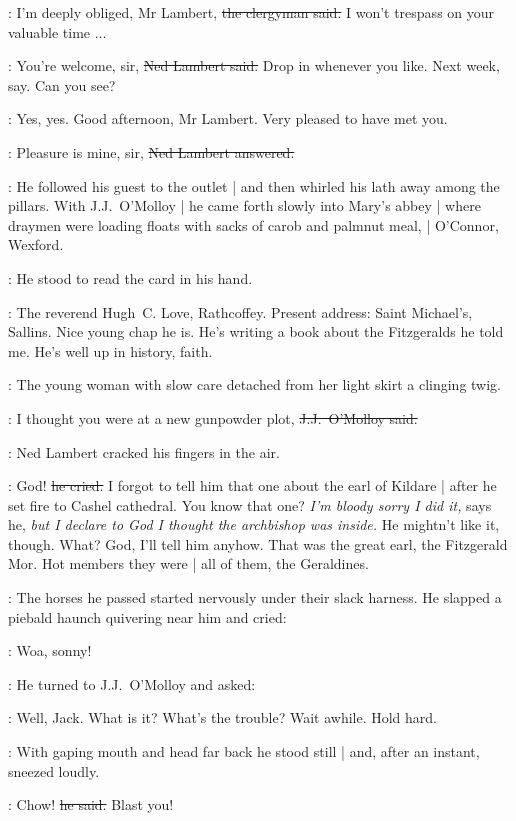 \revlove:
I'm deeply obliged, Mr Lambert,
\sout{the clergyman said.}
I won't trespass on your valuable time ...

\lambert:
You're welcome, sir,
\sout{Ned Lambert said.}
Drop in whenever you like.
Next week, say.
Can you see?

\revlove:
Yes, yes.
Good afternoon, Mr Lambert.
Very pleased to have met you.

\lambert:
Pleasure is mine, sir,
\sout{Ned Lambert answered.}

:
He followed his guest to the outlet |
and then whirled his lath away among the pillars.
With J.J.~O'Molloy |
he came forth slowly into Mary's abbey |
where draymen were loading floats
with sacks of carob and palmnut meal, |
O'Connor, Wexford.

:
He stood to read the card in his hand.

\lambert:
The reverend Hugh~C. Love, Rathcoffey.
Present address:
Saint Michael's, Sallins.
Nice young chap he is.
He's writing a book about the Fitzgeralds he told me.
He's well up in history, faith.

:
The young woman with slow care
detached from her light skirt a clinging twig.

\jjom:
I thought you were at a new gunpowder plot,
\sout{J.J.~O'Molloy said.}

:
Ned Lambert cracked his fingers in the air.

\lambert:
God!
\sout{he cried.}
I forgot to tell him that one about the earl of Kildare |
after he set fire to Cashel cathedral.
You know that one?
\emph{I'm bloody sorry I did it,}
says he,
\emph{but I declare to God I thought the archbishop was inside.}
He mightn't like it, though.
What?
God, I'll tell him anyhow.
That was the great earl, the Fitzgerald Mor.
Hot members they were |
all of them, the Geraldines.

:
The horses he passed
started nervously
under their slack harness.
He slapped a piebald haunch quivering near him and cried:

\lambert:
Woa, sonny!

:
He turned to J.J.~O'Molloy and asked:

\lambert:
Well, Jack.
What is it?
What's the trouble?
Wait awhile.
Hold hard.

:
With gaping mouth and head far back
he stood still |
and, after an instant,
sneezed loudly.

\lambert:
Chow!
\sout{he said.}
Blast you!

